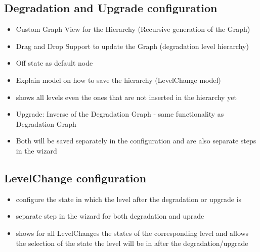 \subsection{Degradation and Upgrade configuration}
\begin{itemize}
    \item Custom Graph View for the Hierarchy (Recursive generation of the Graph)
    \item Drag and Drop Support to update the Graph (degradation level hierarchy)
    \item Off state as default node
    \item Explain model on how to save the hierarchy (LevelChange model) 
    \item shows all levels even the ones that are not inserted in the hierarchy yet
    \item Upgrade: Inverse of the Degradation Graph - same functionality as Degradation Graph
    \item Both will be saved separately in the configuration and are also separate steps in the wizard
\end{itemize}

\subsection{LevelChange configuration}
\begin{itemize}
    \item configure the state in which the level after the degradation or upgrade is
    \item separate step in the wizard for both degradation and uprade
    \item shows for all LevelChanges the states of the corresponding level and allows the selection of the state the level will be in after the degradation/upgrade 
\end{itemize}


